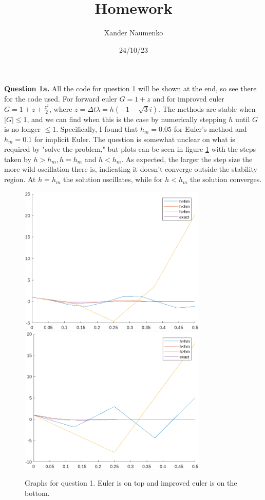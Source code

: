 \documentclass[letterpaper, reqno,11pt]{article}
\begin{document}
\title{Homework }
\date{24/10/23}
\author{Xander Naumenko}
\maketitle

{\medskip\noindent\bf Question 1a.} All the code for question 1 will be shown at the end, so see there for the code used. For forward euler $G=1+z$ and for improved euler $G=1+z+\frac{z^2}{2}$, where $z=\Delta t\lambda=h\left( -1-\sqrt{3}i \right) $. The methods are stable when $|G|\leq 1$, and we can find when this is the case by numerically stepping $h$ until $G$ is no longer $\leq 1$. Specifically, I found that $h_m=0.05$ for Euler's method and $h_m=0.1$ for implicit Euler. The question is somewhat unclear on what is required by "solve the problem," but plots can be seen in figure \ref{fig:q1a} with the steps taken by $h>h_m,h=h_m$ and $h<h_m$. As expected, the larger the step size the more wild oscillation there is, indicating it doesn't converge outside the stability region. At $h=h_m$ the solution oscillates, while for $h<h_m$ the solution converges.

\begin{figure}[htpb]
    \centering
    \includegraphics[width=0.8\textwidth]{q1aFE}
    \includegraphics[width=0.8\textwidth]{q1aImpE}
    \caption{Graphs for question 1. Euler is on top and improved euler is on the bottom.}
    \label{fig:q1a}
\end{figure}
\end{document}
